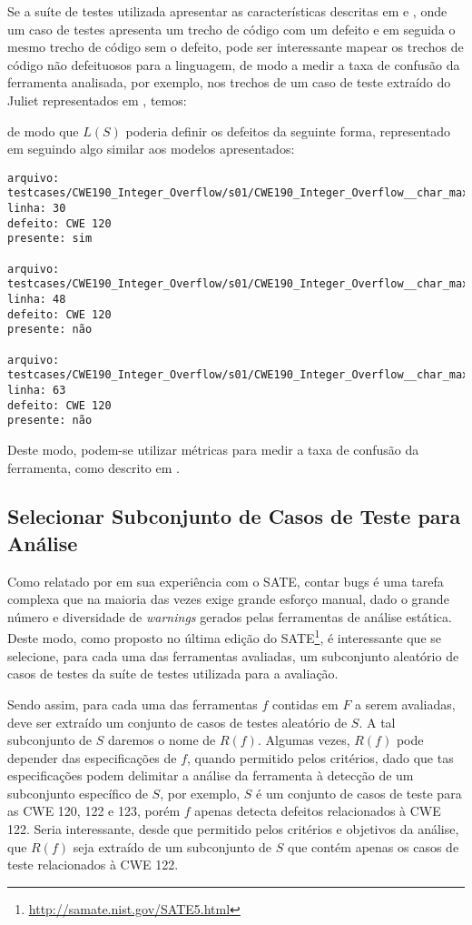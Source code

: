 Se a suíte de testes utilizada apresentar as características descritas em \cite{nsa} e \cite{harvard}, onde um caso de testes apresenta um trecho de código com um defeito e em seguida o mesmo trecho de código sem o defeito, pode ser interessante mapear os trechos de código não defeituosos para a linguagem, de modo a medir a taxa de confusão da ferramenta analisada, por exemplo, nos trechos de um caso de teste extraído do Juliet representados em , temos:

de modo que $L(S)$ poderia definir os defeitos da seguinte forma, representado em  seguindo algo similar aos modelos apresentados:
\begin{lstlisting}[label=exemplo_LS, caption=Exemplo de linguagem para relatórios de defeitos]
arquivo: testcases/CWE190_Integer_Overflow/s01/CWE190_Integer_Overflow__char_max_add_01.c
linha: 30
defeito: CWE 120
presente: sim

arquivo: testcases/CWE190_Integer_Overflow/s01/CWE190_Integer_Overflow__char_max_add_01.c
linha: 48
defeito: CWE 120
presente: não

arquivo: testcases/CWE190_Integer_Overflow/s01/CWE190_Integer_Overflow__char_max_add_01.c
linha: 63
defeito: CWE 120
presente: não
\end{lstlisting}

Deste modo, podem-se utilizar métricas para medir a taxa de confusão da ferramenta, como descrito em \cite{nsa}.

\subsection{Selecionar Subconjunto de Casos de Teste para Análise}

Como relatado por \cite{seatbelts} em sua experiência com o SATE, contar bugs é uma tarefa complexa que na maioria das vezes exige grande esforço manual, dado o grande número e diversidade de \textit{warnings} gerados pelas ferramentas de análise estática. Deste modo, como proposto no última edição do SATE\footnote{\url{http://samate.nist.gov/SATE5.html}}, é interessante que se selecione, para cada uma das ferramentas avaliadas, um subconjunto aleatório de casos de testes da suíte de testes utilizada para a avaliação.

Sendo assim, para cada uma das ferramentas $f$ contidas em $F$ a serem avaliadas,  deve ser extraído um conjunto de casos de testes aleatório de $S$. A tal subconjunto de $S$ daremos o nome de $R(f)$. Algumas vezes, $R(f)$ pode depender das especificações de $f$, quando permitido pelos critérios, dado que tas especificações podem delimitar a análise da ferramenta à detecção de um subconjunto específico de $S$, por exemplo, $S$ é um conjunto de casos de teste para as CWE 120, 122 e 123, porém $f$ apenas detecta defeitos relacionados à CWE 122. Seria interessante, desde que permitido pelos critérios e objetivos da análise, que $R(f)$ seja extraído de um subconjunto de $S$ que contém apenas os casos de teste relacionados à CWE 122.

